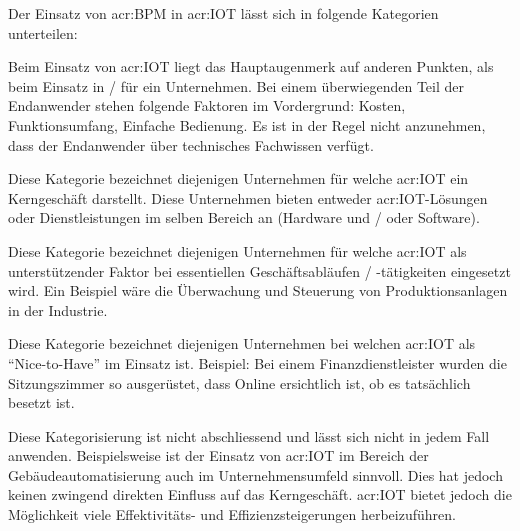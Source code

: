 Der Einsatz von \gls{acr:BPM} in \gls{acr:IOT} lässt sich in folgende Kategorien unterteilen:
\begin{itemize}
{Beim Einsatz von \gls{acr:IOT} liegt das Hauptaugenmerk auf anderen Punkten, als beim Einsatz in / für ein Unternehmen. Bei einem überwiegenden Teil der Endanwender stehen folgende Faktoren im Vordergrund: Kosten, Funktionsumfang, Einfache Bedienung. Es ist in der Regel nicht anzunehmen, dass der Endanwender über technisches Fachwissen verfügt.}

{Diese Kategorie bezeichnet diejenigen Unternehmen für welche \gls{acr:IOT} ein Kerngeschäft darstellt. Diese Unternehmen bieten entweder \gls{acr:IOT}-Lösungen oder Dienstleistungen im selben Bereich an (Hardware und / oder Software).}
 
{Diese Kategorie bezeichnet diejenigen Unternehmen für welche \gls{acr:IOT} als unterstützender Faktor bei essentiellen Geschäftsabläufen / -tätigkeiten eingesetzt wird. Ein Beispiel wäre die Überwachung und Steuerung von Produktionsanlagen in der Industrie.}

{Diese Kategorie bezeichnet diejenigen Unternehmen bei welchen \gls{acr:IOT} als "`Nice-to-Have"' im Einsatz ist. Beispiel: Bei einem Finanzdienstleister wurden die Sitzungszimmer so ausgerüstet, dass Online ersichtlich ist, ob es tatsächlich besetzt ist.}
\end{itemize} 

Diese Kategorisierung ist nicht abschliessend und lässt sich nicht in jedem Fall anwenden. Beispielsweise ist der Einsatz von \gls{acr:IOT} im Bereich der Gebäudeautomatisierung auch im Unternehmensumfeld sinnvoll. Dies hat jedoch keinen zwingend direkten Einfluss auf das Kerngeschäft. \gls{acr:IOT} bietet jedoch die Möglichkeit viele Effektivitäts- und Effizienzsteigerungen herbeizuführen.



